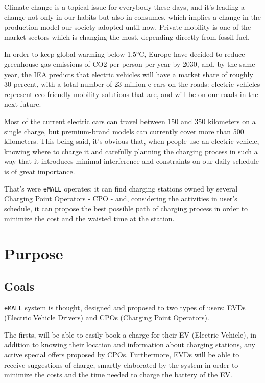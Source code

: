 Climate change is a topical issue for everybody these days, and it's leading a change not only in our habits but also in consumes, which implies a change in the production model our society adopted until now.
Private mobility is one of the market sectors which is changing the most, depending directly from fossil fuel.

In order to keep global warming below 1.5°C, Europe have decided to reduce greenhouse gas emissions of CO2 per
person per year by 2030, and, by the same year, the IEA predicts that electric vehicles will have a market share of roughly 30 percent, with a total number of 23 million e-cars on the roads: electric vehicles represent eco-friendly mobility solutions that are, and will be on our roads in the next future.

Most of the current electric cars can travel between 150 and 350 kilometers on a single charge, but premium-brand models can currently cover more than 500 kilometers.
This being said, it's obvious that, when people use an electric vehicle, knowing where to charge it and carefully planning the
charging process in such a way that it introduces minimal interference and constraints on our daily schedule
is of great importance.

That's were \verb|eMALL| operates: it can find charging stations owned by several Charging Point Operators - CPO - and,
considering the activities in user's schedule, it can propose the best possible path of charging process
in order to minimize the cost and the waisted time at the station.
\newpage


\section{Purpose}
\label{sec:purpose}%

\subsection{Goals}
\label{subsec:goals}%
\setcounter{g}{1}
\newcommand{\cg}{\theg\stepcounter{g}}
\verb|eMALL| system is thought, designed and proposed to two types of users: EVDs (Electric Vehicle Drivers) and CPOs (Charging Point Operators).

The firsts, will be able to easily book a charge for their EV (Electric Vehicle), in addition to knowing their location and information about charging stations, any active special offers proposed by CPOs. Furthermore, EVDs will be able to receive suggestions of charge, smartly elaborated by the system in order to minimize the costs and the time needed to charge the battery
of the EV\@.

